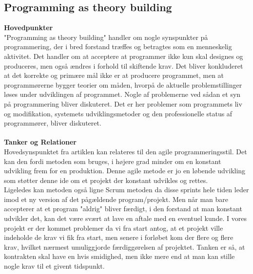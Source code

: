 \documentclass[a4paper]{article}
\begin{document}
\subsection{Programming as theory building}
\textbf{Hovedpunkter}\\
"Programming as theory building" handler om nogle synspunkter på programmering, der i bred forstand træffes og betragtes som en menneskelig aktivitet. Det handler om at acceptere at programmer ikke kun skal designes og produceres, men også ændres i forhold til skiftende krav. Det bliver konkluderet at det korrekte og primære mål ikke er at producere programmet, men at programmørerne bygger teorier om måden, hvorpå de aktuelle problemstillinger løses under udviklingen af programmet. Nogle af problemerne ved sådan et syn på programmering bliver diskuteret. Det er her problemer som programmets liv og modifikation, systemets udviklingsmetoder og den professionelle status af programmører, bliver diskuteret.\\\\
\textbf{Tanker og Relationer}\\
Hovedsynspunktet fra artiklen kan relateres til den agile programmeringsstil. Det kan den fordi metoden som bruges, i højere grad minder om en konstant udvikling frem for en produktion. Denne agile metode er jo en løbende udvikling som støtter denne ide om et projekt der konstant udvikles og rettes.\\
Ligeledes kan metoden også ligne Scrum metoden\cite{Scrum} da disse sprints hele tiden leder imod et ny version af det pågældende program/projekt. Men når man bare accepterer at et program "aldrig" bliver færdigt, i den forstand at man konstant udvikler det, kan det være svært at lave en aftale med en eventuel kunde. I vores projekt er der kommet problemer da vi fra start antog, at et projekt ville indeholde de krav vi fik fra start, men senere i forløbet kom der flere og flere krav, hvilket nærmest umuliggjorde færdiggørelsen af projektet. Tanken er så, at kontrakten skal have en hvis smidighed, men ikke mere end at man kan stille nogle krav til et givent tidspunkt.
\newpage
\end{document}
